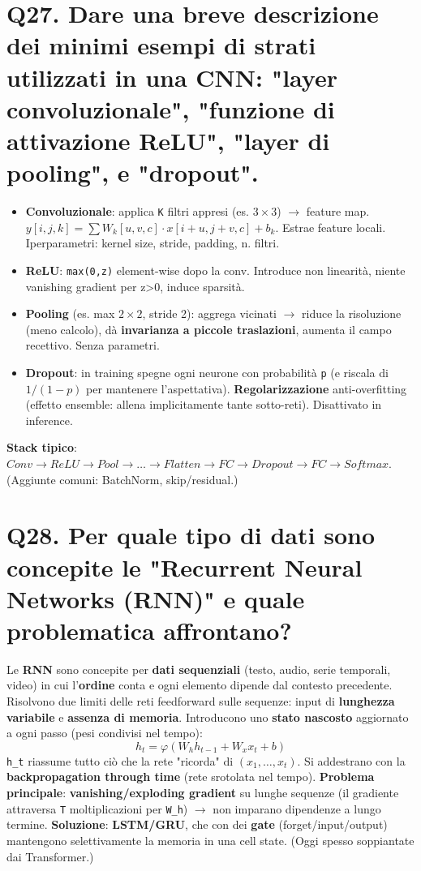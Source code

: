 \documentclass[11pt,a4paper]{article}
\begin{document}
\section*{Q27. Dare una breve descrizione dei minimi esempi di strati utilizzati in una CNN: "layer convoluzionale", "funzione di attivazione ReLU", "layer di pooling", e "dropout".}
\begin{itemize}
\item \textbf{Convoluzionale}: applica \texttt{K} filtri appresi (es. $3\times 3$) $\to $ feature map. $y[i,j,k] = \sum  W_k[u,v,c]\cdot x[i+u,j+v,c] + b_k$. Estrae feature locali. Iperparametri: kernel size, stride, padding, n. filtri.
\item \textbf{ReLU}: \texttt{max(0,z)} element-wise dopo la conv. Introduce non linearità, niente vanishing gradient per z>0, induce sparsità.
\item \textbf{Pooling} (es. max $2\times 2$, stride 2): aggrega vicinati $\to $ riduce la risoluzione (meno calcolo), dà \textbf{invarianza a piccole traslazioni}, aumenta il campo recettivo. Senza parametri.
\item \textbf{Dropout}: in training spegne ogni neurone con probabilità \texttt{p} (e riscala di $1/(1-p)$ per mantenere l'aspettativa). \textbf{Regolarizzazione} anti-overfitting (effetto ensemble: allena implicitamente tante sotto-reti). Disattivato in inference.
\end{itemize}
\textbf{Stack tipico}: $Conv \to  ReLU \to  Pool \to  \dots  \to  Flatten \to  FC \to  Dropout \to  FC \to  Softmax$. (Aggiunte comuni: BatchNorm, skip/residual.)
\newpage
\section*{Q28. Per quale tipo di dati sono concepite le "Recurrent Neural Networks (RNN)" e quale problematica affrontano?}
Le \textbf{RNN} sono concepite per \textbf{dati sequenziali} (testo, audio, serie temporali, video) in cui l'\textbf{ordine} conta e ogni elemento dipende dal contesto precedente.
Risolvono due limiti delle reti feedforward sulle sequenze: input di \textbf{lunghezza variabile} e \textbf{assenza di memoria}. Introducono uno \textbf{stato nascosto} aggiornato a ogni passo (pesi condivisi nel tempo):
\[ h_t = \varphi (W_h h_{t-1} + W_x x_t + b) \]
\texttt{h\_t} riassume tutto ciò che la rete "ricorda" di $(x_{1},\dots ,x_t)$. Si addestrano con la \textbf{backpropagation through time} (rete srotolata nel tempo).
\textbf{Problema principale}: \textbf{vanishing/exploding gradient} su lunghe sequenze (il gradiente attraversa \texttt{T} moltiplicazioni per \texttt{W\_h}) $\to $ non imparano dipendenze a lungo termine. \textbf{Soluzione}: \textbf{LSTM/GRU}, che con dei \textbf{gate} (forget/input/output) mantengono selettivamente la memoria in una cell state. (Oggi spesso soppiantate dai Transformer.)
\newpage
\end{document}
